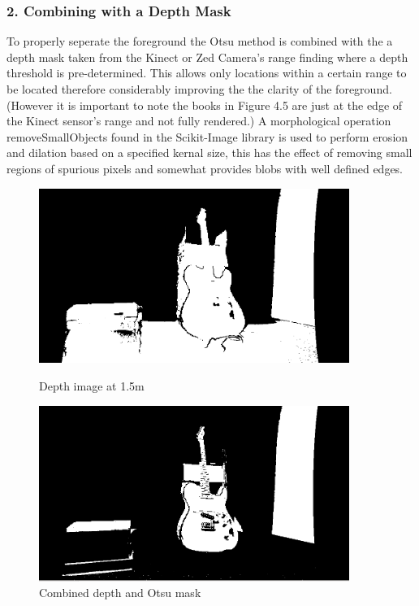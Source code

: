 \documentclass{mproj}
\begin{document}
\subsubsection{2. Combining with a Depth Mask}

To properly seperate the foreground the Otsu method is combined with the a depth mask taken from the Kinect or Zed Camera's range finding where a depth threshold is pre-determined. This allows only locations within a certain range to be located therefore considerably improving the the clarity of the foreground. (However it is important to note the books in Figure 4.5 are just at the edge of the Kinect sensor's range and not fully rendered.) A morphological operation removeSmallObjects found in the Scikit-Image library is used to perform erosion and dilation based on a specified kernal size, this has the effect of removing small regions of spurious pixels and somewhat provides blobs with well defined edges.


\begin{figure}
    \centering
    \begin{minipage}{0.45\textwidth}
        \centering
        \includegraphics[width=0.9\textwidth]{images/depth.png} %
        \caption{Depth image at 1.5m}
    \end{minipage}\hfill
    \begin{minipage}{0.45\textwidth}
        \centering
        \includegraphics[width=0.9\textwidth]{images/combined.png} %
        \caption{Combined depth and Otsu mask}
    \end{minipage}
\end{figure}
\end{document}
